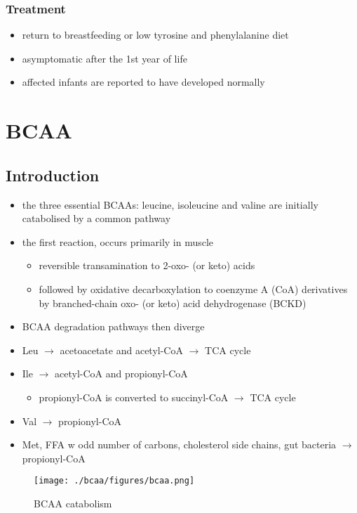 \documentclass{scrartcl}
\begin{document}
\subsubsection{Treatment}
\label{sec:org2b4ffcd}
\begin{itemize}
\item return to breastfeeding or low tyrosine and phenylalanine diet
\item asymptomatic after the 1st year of life
\item affected infants are reported to have developed normally
\end{itemize}

\section{BCAA}
\label{sec:org3f14e06}
\subsection{Introduction}
\label{sec:org56fe4fb}
\begin{itemize}
\item the three essential BCAAs: leucine, isoleucine and valine are
initially catabolised by a common pathway
\item the first reaction, occurs primarily in muscle
\begin{itemize}
\item reversible transamination to 2-oxo- (or keto) acids
\item followed by oxidative decarboxylation to coenzyme A (CoA)
derivatives by branched-chain oxo- (or keto) acid dehydrogenase
(BCKD)
\end{itemize}
\item BCAA degradation pathways then diverge
\item Leu \(\to\) acetoacetate and acetyl-CoA \(\to\) TCA cycle
\item Ile \(\to\) acetyl-CoA and propionyl-CoA
\begin{itemize}
\item propionyl-CoA is converted to succinyl-CoA \(\to\) TCA cycle
\end{itemize}
\item Val \(\to\) propionyl-CoA
\item Met, FFA w odd number of carbons, cholesterol side chains, gut
bacteria \(\to\) propionyl-CoA
\end{itemize}

\begin{figure}[htbp]
\centering
\texttt{[image: ./bcaa/figures/bcaa.png]}
\caption{\label{fig:orgcea7f16}
BCAA catabolism}
\end{figure}
\end{document}
